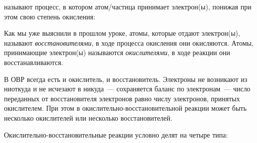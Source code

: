 
 называют процесс, в котором атом/частица принимает электрон(ы), понижая при этом свою степень окисления:


Как мы уже выяснили в прошлом уроке, атомы, которые отдают электрон(ы), называют \emph{восстановителями}, в ходе процесса окисления они окисляются. Атомы, принимающие электрон(ы) называются \emph{окислителями}, в ходе реакции они восстанавливаются.

В ОВР всегда есть и окислитель, и восстановитель. Электроны не возникают из ниоткуда и не исчезают в никуда~--- сохраняется баланс по электронам~--- число переданных от восстановителя электронов равно числу электронов, принятых окислителем. При этом в окислительно-восстановительной реакции может быть несколько окислителей или несколько восстановителей.

Окислительно-восстановительные реакции условно делят на четыре типа:

